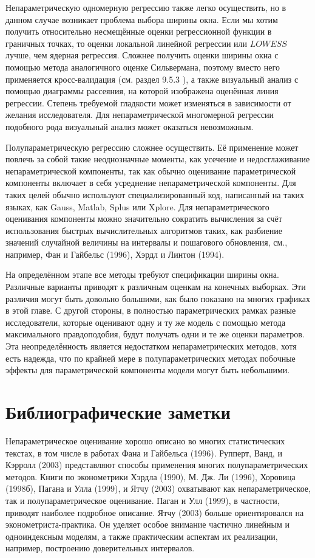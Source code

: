 Непараметрическую одномерную регрессию также легко осуществить, но в данном случае возникает проблема выбора ширины окна. Если мы хотим получить относительно несмещённые оценки регрессионной функции в граничных точках, то оценки локальной линейной регрессии или $LOWESS$ лучше, чем ядерная регрессия. Сложнее получить оценки ширины окна с помощью метода аналогичного оценке Сильвермана, поэтому вместо него применяется кросс-валидация (см. раздел 9.5.3 ), а также визуальный анализ с помощью диаграммы рассеяния, на которой изображена оценённая линия регрессии. Степень требуемой гладкости может изменяться в зависимости от желания исследователя. Для непараметрической многомерной регрессии подобного рода визуальный анализ может оказаться невозможным.

Полупараметрическую регрессию сложнее осуществить. Её применение может повлечь за собой такие неоднозначные моменты, как усечение и недосглаживание непараметрической компоненты, так как обычно оценивание параметрической компоненты включает в себя усреднение непараметрической компоненты. Для таких целей обычно используют специализированный код, написанный на таких языках, как Gauss, Matlab, Splus или Xplore. Для непараметрического оценивания компоненты можно значительно сократить вычисления за счёт использования быстрых вычислительных алгоритмов таких, как разбиение значений случайной величины на интервалы и пошагового обновления, см., например, Фан и Гайбельс (1996), Хэрдл и Линтон (1994).

На определённом этапе все методы требуют спецификации ширины окна. Различные варианты приводят к различным оценкам на конечных выборках. Эти различия могут быть довольно большими, как было показано на многих графиках в этой главе. С другой стороны, в полностью параметрических рамках разные исследователи, которые оценивают одну и ту же модель с помощью метода максимального правдоподобия, будут получать одни и те же оценки параметров. Эта неопределённость является недостатком непараметрических методов, хотя есть надежда, что по крайней мере в полупараметрических методах побочные эффекты для параметрической компоненты модели могут быть небольшими.

\section{Библиографические заметки}

Непараметрическое оценивание хорошо описано во многих статистических текстах, в том числе в работах Фана и Гайбельса (1996). Рупперт, Ванд, и Кэрролл (2003) представляют способы применения многих полупараметрических методов. Книги по эконометрики Хэрдла (1990), М. Дж. Ли (1996), Хоровица (1998б), Пагана и Улла (1999), и Ятчу (2003) охватывают как непараметрическое, так и полупараметрическое оценивание. Паган и Улл (1999), в частности, приводят наиболее подробное описание. Ятчу (2003) больше ориентировался на эконометриста-практика. Он уделяет особое внимание частично линейным и одноиндексным моделям, а также практическим аспектам их реализации, например, построению доверительных интервалов.

